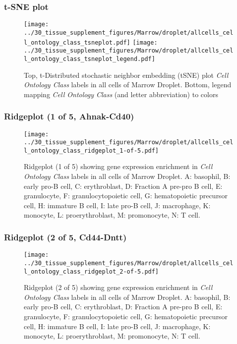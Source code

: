 \clearpage
\subsubsection{t-SNE plot}
\begin{figure}[h]
\centering
\texttt{[image: ../30\_tissue\_supplement\_figures/Marrow/droplet/allcells\_cell\_ontology\_class\_tsneplot.pdf]}
\texttt{[image: ../30\_tissue\_supplement\_figures/Marrow/droplet/allcells\_cell\_ontology\_class\_tsneplot\_legend.pdf]}
\caption{Top, t-Distributed stochastic neighbor embedding (tSNE) plot  \emph{Cell Ontology Class} labels in all cells of Marrow Droplet. Bottom, legend mapping \emph{Cell Ontology Class} (and letter abbreviation) to colors}
\end{figure}


\clearpage

\subsubsection{Ridgeplot (1 of 5, Ahnak-Cd40)}
\begin{figure}[h]
\centering
\texttt{[image: ../30\_tissue\_supplement\_figures/Marrow/droplet/allcells\_cell\_ontology\_class\_ridgeplot\_1-of-5.pdf]}

\caption{ Ridgeplot (1 of 5)  showing gene expression enrichment in \emph{Cell Ontology Class} labels in all cells of Marrow Droplet. A: basophil, B: early pro-B cell, C: erythroblast, D: Fraction A pre-pro B cell, E: granulocyte, F: granulocytopoietic cell, G: hematopoietic precursor cell, H: immature B cell, I: late pro-B cell, J: macrophage, K: monocyte, L: proerythroblast, M: promonocyte, N: T cell.}
\end{figure}


\clearpage

\subsubsection{Ridgeplot (2 of 5, Cd44-Dntt)}
\begin{figure}[h]
\centering
\texttt{[image: ../30\_tissue\_supplement\_figures/Marrow/droplet/allcells\_cell\_ontology\_class\_ridgeplot\_2-of-5.pdf]}

\caption{ Ridgeplot (2 of 5)  showing gene expression enrichment in \emph{Cell Ontology Class} labels in all cells of Marrow Droplet. A: basophil, B: early pro-B cell, C: erythroblast, D: Fraction A pre-pro B cell, E: granulocyte, F: granulocytopoietic cell, G: hematopoietic precursor cell, H: immature B cell, I: late pro-B cell, J: macrophage, K: monocyte, L: proerythroblast, M: promonocyte, N: T cell.}
\end{figure}


